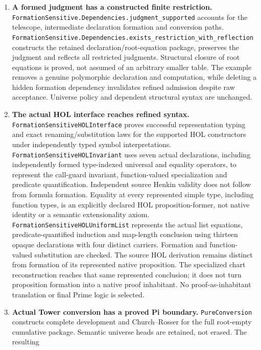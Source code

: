 \documentclass[11pt]{article}
\theoremstyle{definition}
\theoremstyle{remark}
\begin{document}
\begin{enumerate}
  are discharged as recorded below. Redirected recursive evidence and changed
  identity endpoints fail the original root relation.
\item \textbf{A formed judgment has a constructed finite restriction.}
  \nolinkurl{FormationSensitive.Dependencies.judgment_supported} accounts for
  the telescope, intermediate declaration formation and conversion paths.
  \nolinkurl{FormationSensitive.Dependencies.exists_restriction_with_reflection}
  constructs the retained declaration/root-equation package, preserves the
  judgment and reflects all restricted judgments. Structural closure of root
  equations is proved, not assumed of an arbitrary smaller table. The example
  removes a genuine polymorphic declaration and computation, while deleting a
  hidden formation dependency invalidates refined admission despite raw
  acceptance. Universe policy and dependent structural syntax are unchanged.
\item \textbf{The actual HOL interface reaches refined syntax.}
  \nolinkurl{FormationSensitiveHOLInterface} proves successful representation
  typing and exact renaming/substitution laws for the supported HOL
  constructors under independently typed symbol interpretations.
  \nolinkurl{FormationSensitiveHOLInvariant} uses seven actual declarations,
  including independently formed type-indexed universal and equality operators, to
  represent the call-guard invariant, function-valued specialization and
  predicate quantification. Independent source Henkin validity does not
  follow from formula formation. Equality at every represented simple type,
  including function types, is an explicitly declared HOL proposition-former,
  not native identity or a semantic extensionality axiom.
  \nolinkurl{FormationSensitiveHOLUniformList} represents the actual list
  equations, predicate-quantified induction and map-length conclusion using
  thirteen opaque declarations with four distinct carriers. Formation and
  function-valued substitution are checked. The source HOL derivation remains
  distinct from formation of its represented native proposition. The
  specialized chart reconstruction reaches that same represented conclusion;
  it does not turn proposition formation into a native proof inhabitant.
  No proof-as-inhabitant translation or final Prime logic is selected.
\item \textbf{Actual Tower conversion has a proved Pi boundary.}
  \nolinkurl{PureConversion} constructs complete development and
  Church--Rosser for the full root-empty cumulative package. Semantic
  universe heads are retained, not erased. The resulting

\end{enumerate}
\end{document}
